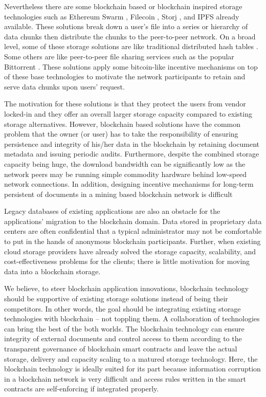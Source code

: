Nevertheless there are some blockchain based or blockchain inspired storage technologies such as Ethereum Swarm \cite{swarm}, Filecoin \cite{filecoin}, Storj \cite{Wilkinson14storja}, and IPFS \cite{ipfs} already available. These solutions break down a user's file into a series or hierarchy of data chunks then distribute the chunks to the peer-to-peer network. On a broad level, some of these storage solutions are like traditional distributed hash tables \cite{Maymounkov:2002:KPI:646334.687801} \cite{10.1007/978-3-540-45172-3_4}. Some others are like peer-to-peer file sharing services such as the popular Bittorrent \cite{Pouwelse:2005:BPF:2138958.2138984}. These solutions apply some bitcoin-like incentive mechanisms on top of these base technologies to motivate the network participants to retain and serve data chunks upon users' request.  

The motivation for these solutions is that they protect the users from vendor locked-in and they offer an overall larger storage capacity compared to existing storage alternatives. However, blockchain based solutions have the common problem that the owner (or user) has to take the responsibility of ensuring persistence and integrity of his/her data in the blockchain by retaining document metadata and issuing periodic audits. Furthermore, despite the combined storage capacity being huge, the download bandwidth can be significantly low as the network peers may be running simple commodity hardware behind low-speed network connections. In addition, designing incentive mechanisms for long-term persistent of documents in a mining based blockchain network is difficult 

Legacy databases of existing applications are also an obstacle for the applications' migration to the blockchain domain. Data stored in proprietary data centers are often confidential that a typical administrator may not be comfortable to put in the hands of anonymous blockchain participants. Further, when existing cloud storage providers \cite{Murty:2008:PAW:1407893} \cite{googleCloud} have already solved the storage capacity, scalability, and cost-effectiveness problems for the clients; there is little motivation for moving data into a blockchain storage.     

We believe, to steer blockchain application innovations, blockchain technology should be supportive of existing storage solutions instead of being their competitors. In other words, the goal should be integrating existing storage technologies with blockchain -- not toppling them. A collaboration of technologies can bring the best of the both worlds. The blockchain technology can ensure integrity of external documents and control access to them according to the transparent governance of blockchain smart contracts and leave the actual storage, delivery and capacity scaling to a matured storage technology. Here, the blockchain technology is ideally suited for its part because information corruption in a blockchain network is very difficult and access rules written in the smart contracts are self-enforcing if integrated properly.

